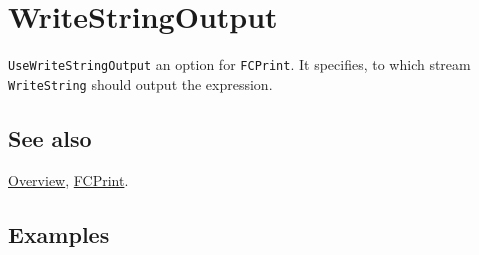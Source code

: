 \documentclass[../FeynCalcManual.tex]{subfiles}
\begin{document}
\hypertarget{writestringoutput}{%
\section{WriteStringOutput}\label{writestringoutput}}

\texttt{UseWriteStringOutput} an option for \texttt{FCPrint}. It
specifies, to which stream \texttt{WriteString} should output the
expression.

\subsection{See also}

\hyperlink{toc}{Overview}, \hyperlink{fcprint}{FCPrint}.

\subsection{Examples}
\end{document}
